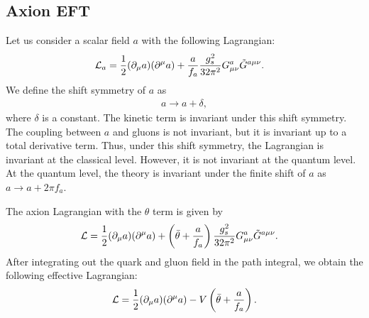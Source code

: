 \documentclass[11pt,a4paper]{article}
\begin{document}
\subsection{Axion EFT}
Let us consider a scalar field $a$ with the following Lagrangian:
\begin{align}
    {\cal L}_a &= \frac{1}{2} (\partial_\mu a)(\partial^\mu a) + \frac{a}{f_a} \frac{g_s^2}{32\pi^2} G_{\mu\nu}^a \tilde G^{a\mu\nu}. \label{eq:axion EFT}
\end{align}
We define the shift symmetry of $a$ as
\begin{align}
    a \to a + \delta,
\end{align}
where $\delta$ is a constant.
The kinetic term is invariant under this shift symmetry. The coupling between $a$ and gluons is not invariant, but it is invariant up to a total derivative term.
Thus, under this shift symmetry, the Lagrangian is invariant at the classical level. However, it is not invariant at the quantum level. At the quantum level, the theory is invariant under the finite shift of $a$ as $a \to a + 2\pi f_a$.

The axion Lagrangian with the $\theta$ term is given by
\begin{align}
    {\cal L} &= \frac{1}{2} (\partial_\mu a)(\partial^\mu a) + \left( \bar\theta + \frac{a}{f_a} \right) \frac{g_s^2}{32\pi^2} G_{\mu\nu}^a \tilde G^{a\mu\nu}. \label{eq:axion EFT with theta}
\end{align}
After integrating out the quark and gluon field in the path integral, we obtain the following effective Lagrangian:
\begin{align}
    {\cal L} = \frac{1}{2} (\partial_\mu a)(\partial^\mu a) - V\left(\bar\theta + \frac{a}{f_a}\right).
\end{align}
\end{document}
